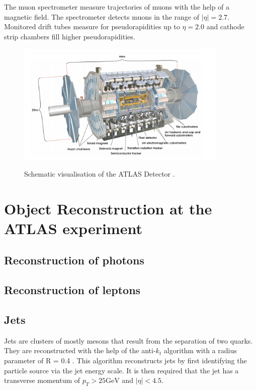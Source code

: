 The muon spectrometer measure trajectories of muons with the help of a magnetic field. The spectrometer detects muons in the range of $\bigl|\eta\bigr| = 2.7$. 
Monitored drift tubes measure for pseudorapidities up to $\eta = 2.0$ and cathode strip chambers fill higher pseudorapidities.  
\begin{figure}
    \centering
    \includegraphics[width=0.9\textwidth]{Plots/atlasSCHEMA.PNG}
    \label{fig:atlasschema}
    \caption{Schematic visualisation of the ATLAS Detector \cite{Collaboration_2008}.}
\end{figure}



\section{Object Reconstruction at the ATLAS experiment}

\subsection{Reconstruction of photons}


\subsection{Reconstruction of leptons}
\subsection{Jets}

Jets are clusters of mostly mesons that result from the separation of two quarks. They are reconstructed with the help of the anti-$k_t$ algorithm with a radius parameter of R = 0.4 \cite{anti_k_t}. 
This algorithm reconstructs jets by first identifying the particle source via the jet energy scale. It is then required that the jet has a transverse momentum of $p_T > 25 \si{\giga\electronvolt}$ and $\bigl|\eta\bigr| < 4.5$. 

